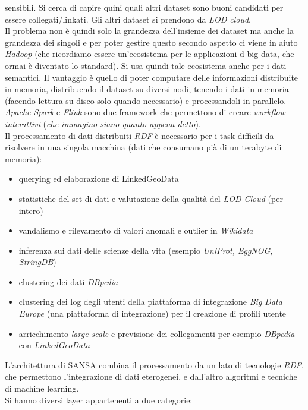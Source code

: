 \documentclass[a4paper,12pt, oneside]{book}
\begin{document}
sensibili. Si cerca di capire quini quali altri dataset sono buoni candidati per
essere collegati/linkati. Gli altri dataset si prendono da \textit{LOD cloud}.\\
Il problema non è quindi solo la grandezza dell'insieme dei dataset ma anche la
grandezza dei singoli e per poter gestire questo secondo aspetto ci viene in
aiuto \textit{Hadoop} (che ricordiamo essere un'ecosistema per le applicazioni d
big data, che ormai è diventato lo standard). Si usa quindi tale ecosistema
anche per i dati semantici. Il vantaggio è quello di poter computare delle
informazioni distribuite in memoria, distribuendo il dataset su diversi nodi,
tenendo i dati in memoria (facendo lettura su disco solo quando necessario) e
processandoli in parallelo. \\
\textit{Apache Spark} e \textit{Flink} sono due
framework che permettono di creare \textit{workflow interattivi} (\textit{che
  immagino siano quanto appena detto}).\\
Il processamento di dati distribuiti \textit{RDF} è necessario per i task
difficili da risolvere in una singola macchina (dati che consumano pià di un
terabyte di memoria):
\begin{itemize}
  \item querying ed elaborazione di LinkedGeoData 
  \item statistiche del set di dati e valutazione della qualità del \textit{LOD
    Cloud} (per intero)
  \item vandalismo e rilevamento di valori anomali e outlier in
  \textit{Wikidata} 
  \item inferenza sui dati delle scienze della vita (esempio \textit{UniProt,
    EggNOG, 
  StringDB}) 
  \item clustering dei dati \textit{DBpedia}
  \item clustering dei log degli utenti della piattaforma di integrazione
  \textit{Big Data Europe} (una piattaforma di integrazione) per il creazione
  di profili utente  
  \item arricchimento \textit{large-scale} e previsione dei collegamenti per
  esempio \textit{DBpedia} con \textit{LinkedGeoData}
\end{itemize}
L'architettura di SANSA combina il processamento da un lato di tecnologie
\textit{RDF}, che permettono l'integrazione di dati eterogenei, e dall'altro
algoritmi e tecniche di machine learning.\\
Si hanno diversi layer appartenenti a due categorie:
\end{document}
